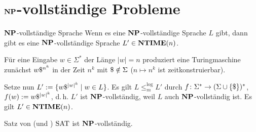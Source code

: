 \section{%
    \texorpdfstring{$\mathbf{NP}$}{NP}-vollständige Probleme%
}

\begin{Satz}{$\mathbf{NP}$-vollständige Sprache}
    Wenn es eine $\mathbf{NP}$-vollständige Sprache $L$ gibt,
    dann gibt es eine $\mathbf{NP}$-vollständige Sprache $L' \in \mathbf{NTIME}(n)$.
\end{Satz}

\begin{Beweis}
    Für eine Eingabe $w \in \Sigma^\ast$ der Länge $|w| = n$
    produziert eine Turingmaschine zunächst $w\$^{n^k}$ in der Zeit
    $n^k$ mit $\$ \notin \Sigma$ ($n \mapsto n^k$ ist zeitkonstruierbar).

    Setze nun $L' := \{w\$^{|w|^k} \;|\; w \in L\}$.
    Es gilt $L \le_m^{\log} L'$ durch
    $f\colon \Sigma^\ast \rightarrow (\Sigma \cup \{\$\})^\ast$,
    $f(w) := w\$^{|w|^k}$, d.\,h. $L'$ ist $\mathbf{NP}$-vollständig, weil
    $L$ auch $\mathbf{NP}$-vollständig ist.
    Es gilt $L' \in \mathbf{NTIME}(n)$.
\end{Beweis}

\linie

\begin{Satz}{Satz von  (und )}
    $\text{SAT}$ ist $\mathbf{NP}$-vollständig.
\end{Satz}

